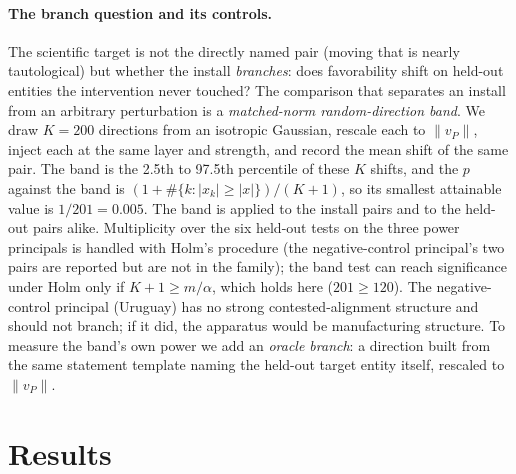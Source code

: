\documentclass{article}
\newcommand{\Model}{\ModelA}
\begin{document}
\paragraph{The branch question and its controls.}
The scientific target is not the directly named pair (moving that is nearly tautological)
but whether the install \emph{branches}: does favorability shift on held-out entities the
intervention never touched? The comparison that separates an install from an arbitrary perturbation is
a \emph{matched-norm random-direction band}. We draw $K{=}200$ directions from an isotropic Gaussian,
rescale each to $\lVert v_P\rVert$, inject each at the same layer and strength, and record the mean shift of the
same pair. The band is the 2.5th to 97.5th percentile of these $K$ shifts, and the $p$ against the band is
$(1+\#\{k:|x_k|\ge|x|\})/(K+1)$, so its smallest attainable value is $1/201{=}0.005$. The band is applied to the install pairs and to the
held-out pairs alike. Multiplicity over the six held-out tests on the three power principals is handled with Holm's procedure
(the negative-control principal's two pairs are reported but are not in the family); the band test can reach significance under Holm
only if $K{+}1\ge m/\alpha$, which holds here ($201\ge120$). The negative-control principal (Uruguay) has no strong
contested-alignment structure and should not branch; if it did, the apparatus would be manufacturing structure.
To measure the band's own power we add an \emph{oracle branch}: a direction built from the same statement
template naming the held-out target entity itself, rescaled to $\lVert v_P\rVert$.

\section{Results}
\label{sec:results}

\begin{table}[t]
\centering
\scriptsize
\caption{Real \Model{} audit ($\ell{=}10$, $\alpha{=}6$, $K{=}200$). All four install pairs and all eight held-out pairs are shown. Shifts
are steered minus clean favor. Holm adjustment is over the six held-out tests on the three power principals; the two Uruguay pairs are
the negative control. ``Random band'' is the 95\% interval of the $K$ matched-norm random directions. No effect, install or branch,
lies outside its band ($p$ vs band $\ge$ \cInstBandPMin{} in every row).}
\label{tab:main}
\mainTableA
\end{table}
\end{document}
